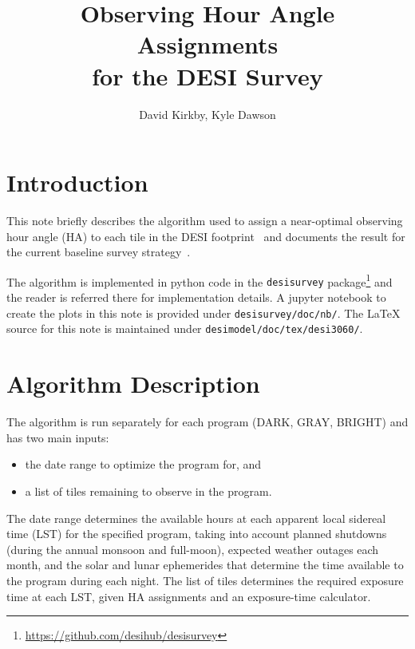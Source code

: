 \documentclass[12pt]{article}
\title{Observing Hour Angle Assignments\\
for the DESI Survey\\
\vspace{5mm}{\large\bf DESI-doc-3060-v1}}
\author{David Kirkby, Kyle Dawson}
\begin{document}
\maketitle

\section{Introduction}

This note briefly describes the algorithm used to assign a near-optimal observing hour angle (HA) to each tile in the DESI footprint~\cite{desi-717} and documents the result for the current baseline survey strategy~\cite{desi-1767, desi-1770}.

The algorithm is implemented in python code in the {\tt desisurvey} package\footnote{\url{https://github.com/desihub/desisurvey}} and the reader is referred there for implementation details. A jupyter notebook to create the plots in this note is provided under {\tt desisurvey/doc/nb/}. The LaTeX source for this note is maintained under {\tt desimodel/doc/tex/desi3060/}.

\section{Algorithm Description}

The algorithm is run separately for each program (DARK, GRAY, BRIGHT) and has two main inputs:
\begin{itemize}
    \item the date range to optimize the program for, and
    \item a list of tiles remaining to observe in the program.
\end{itemize}
The date range determines the available hours at each apparent local sidereal time (LST) for the specified program, taking into account planned shutdowns (during the annual monsoon and full-moon), expected weather outages each month, and the solar and lunar ephemerides that determine the time available to the program during each night. The list of tiles determines the required exposure time at each LST, given HA assignments and an exposure-time calculator.
\end{document}
